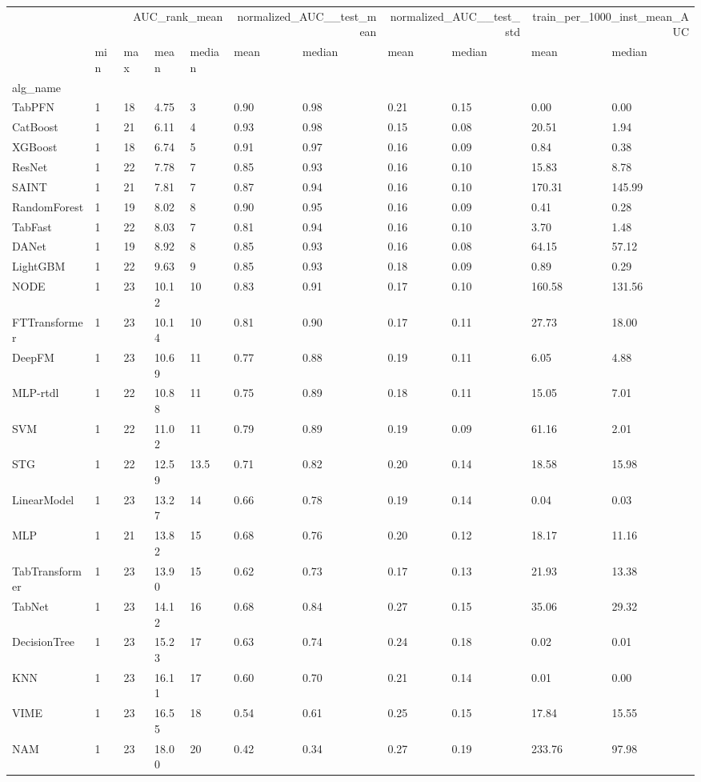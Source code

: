 \begin{tabular}{lllllllllll}
\toprule
 & \multicolumn{4}{r}{AUC_rank_mean} & \multicolumn{2}{r}{normalized_AUC__test_mean} & \multicolumn{2}{r}{normalized_AUC__test_std} & \multicolumn{2}{r}{train_per_1000_inst_mean_AUC} \\
 & min & max & mean & median & mean & median & mean & median & mean & median \\
alg_name &  &  &  &  &  &  &  &  &  &  \\
\midrule
TabPFN & 1 & 18 & 4.75 & 3 & 0.90 & 0.98 & 0.21 & 0.15 & 0.00 & 0.00 \\
CatBoost & 1 & 21 & 6.11 & 4 & 0.93 & 0.98 & 0.15 & 0.08 & 20.51 & 1.94 \\
XGBoost & 1 & 18 & 6.74 & 5 & 0.91 & 0.97 & 0.16 & 0.09 & 0.84 & 0.38 \\
ResNet & 1 & 22 & 7.78 & 7 & 0.85 & 0.93 & 0.16 & 0.10 & 15.83 & 8.78 \\
SAINT & 1 & 21 & 7.81 & 7 & 0.87 & 0.94 & 0.16 & 0.10 & 170.31 & 145.99 \\
RandomForest & 1 & 19 & 8.02 & 8 & 0.90 & 0.95 & 0.16 & 0.09 & 0.41 & 0.28 \\
TabFast & 1 & 22 & 8.03 & 7 & 0.81 & 0.94 & 0.16 & 0.10 & 3.70 & 1.48 \\
DANet & 1 & 19 & 8.92 & 8 & 0.85 & 0.93 & 0.16 & 0.08 & 64.15 & 57.12 \\
LightGBM & 1 & 22 & 9.63 & 9 & 0.85 & 0.93 & 0.18 & 0.09 & 0.89 & 0.29 \\
NODE & 1 & 23 & 10.12 & 10 & 0.83 & 0.91 & 0.17 & 0.10 & 160.58 & 131.56 \\
FTTransformer & 1 & 23 & 10.14 & 10 & 0.81 & 0.90 & 0.17 & 0.11 & 27.73 & 18.00 \\
DeepFM & 1 & 23 & 10.69 & 11 & 0.77 & 0.88 & 0.19 & 0.11 & 6.05 & 4.88 \\
MLP-rtdl & 1 & 22 & 10.88 & 11 & 0.75 & 0.89 & 0.18 & 0.11 & 15.05 & 7.01 \\
SVM & 1 & 22 & 11.02 & 11 & 0.79 & 0.89 & 0.19 & 0.09 & 61.16 & 2.01 \\
STG & 1 & 22 & 12.59 & 13.5 & 0.71 & 0.82 & 0.20 & 0.14 & 18.58 & 15.98 \\
LinearModel & 1 & 23 & 13.27 & 14 & 0.66 & 0.78 & 0.19 & 0.14 & 0.04 & 0.03 \\
MLP & 1 & 21 & 13.82 & 15 & 0.68 & 0.76 & 0.20 & 0.12 & 18.17 & 11.16 \\
TabTransformer & 1 & 23 & 13.90 & 15 & 0.62 & 0.73 & 0.17 & 0.13 & 21.93 & 13.38 \\
TabNet & 1 & 23 & 14.12 & 16 & 0.68 & 0.84 & 0.27 & 0.15 & 35.06 & 29.32 \\
DecisionTree & 1 & 23 & 15.23 & 17 & 0.63 & 0.74 & 0.24 & 0.18 & 0.02 & 0.01 \\
KNN & 1 & 23 & 16.11 & 17 & 0.60 & 0.70 & 0.21 & 0.14 & 0.01 & 0.00 \\
VIME & 1 & 23 & 16.55 & 18 & 0.54 & 0.61 & 0.25 & 0.15 & 17.84 & 15.55 \\
NAM & 1 & 23 & 18.00 & 20 & 0.42 & 0.34 & 0.27 & 0.19 & 233.76 & 97.98 \\
\bottomrule
\end{tabular}
